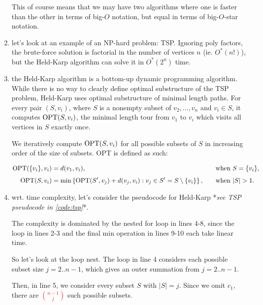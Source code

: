 \begin{enumerate}
\begin{textgray}
    This of course means that we may have two algorithms where one is faster
    than the other in terms of big-$O$ notation, but equal in terms of
    big-$O$-star notation.
    \end{textgray}

  \item let's look at an example of an NP-hard problem: TSP. Ignoring poly
    factors, the brute-force solution is factorial in the number of vertices $n$
    (ie. $O^\ast(n!)$), but the Held-Karp algorithm can solve it in
    $O^\ast(2^{n})$ time.

  \item the Held-Karp algorithm is a bottom-up dynamic programming algorithm.
    While there is no way to clearly define optimal substructure of the TSP
    problem, Held-Karp uses optimal substructure of minimal length paths.
    For every pair $(S, v_i)$, where $S$ is a nonempty subset of ${v_2, \dots,
    v_n}$ and $v_i \in S$, it computes $\text{OPT}(S, v_i)$, the minimal length tour
    from $v_1$ to $v_i$ which visits all vertices in $S$ exactly once.

    We iteratively compute $\text{OPT}(S, v_i)$ for all possible subsets of $S$ in
    increasing order of the size of subsets. OPT is defined as such:

    \begin{textred}
    \begin{alignat*}{4}
      \text{OPT}(\{v_i\}, v_i) &= d(v_1, v_i), \quad &&\text{when } S = \{v_i\},\\[4pt]
      \text{OPT}(S, v_i) &= \min\left\{\text{OPT}(S', v_j) + d(v_j, v_i) : v_j \in S' = S
      \setminus \{v_i\} \right\}  ,\quad &&\text{when } |S| > 1.
    \end{alignat*}
    \end{textred}

  \item wrt. time complexity, let's consider the pseudocode for Held-Karp
    *\emph{see TSP pseudocode in \cref{code:tsp}}*.

    The complexity is dominated by the nested for loop in lines 4-8, since the
    loop in lines 2-3 and the final min operation in lines 9-10 each take linear
    time.

    So let's look at the loop nest. The loop in line 4 considers each possible
    subset size $j = 2 .. n - 1$, which gives an outer summation
    from $j = 2 .. n - 1$.

    Then, in line 5, we consider every subset $S$ with $|S| = j$. Since we omit
    $c_1$, there are \textcolor{red}{$\binom{n-1}{j}$} such possible subsets.


\end{enumerate}
